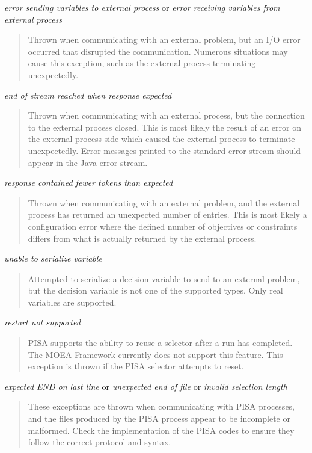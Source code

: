 \noindent
\textit{error sending variables to external process} or
\textit{error receiving variables from external process}
\begin{quote}
  Thrown when communicating with an external problem, but an I/O error occurred that disrupted the communication.  Numerous situations may cause this exception, such as the external process terminating unexpectedly.
\end{quote}

\noindent
\textit{end of stream reached when response expected}
\begin{quote}
  Thrown when communicating with an external process, but the connection to the external process closed.  This is most likely the result of an error on the external process side which caused the external process to terminate unexpectedly.  Error messages printed to the standard error stream should appear in the Java error stream.
\end{quote}

\noindent
\textit{response contained fewer tokens than expected}
\begin{quote}
  Thrown when communicating with an external problem, and the external process has returned an unexpected number of entries.  This is most likely a configuration error where the defined number of objectives or constraints differs from what is actually returned by the external process.
\end{quote}

\noindent
\textit{unable to serialize variable}
\begin{quote}
  Attempted to serialize a decision variable to send to an external problem, but the decision variable is not one of the supported types.  Only real variables are supported.
\end{quote}

\noindent
\textit{restart not supported}
\begin{quote}
  PISA supports the ability to reuse a selector after a run has completed. The MOEA Framework currently does not support this feature.  This exception is thrown if the PISA selector attempts to reset.
\end{quote}

\noindent
\textit{expected END on last line} or
\textit{unexpected end of file} or
\textit{invalid selection length}
\begin{quote}
  These exceptions are thrown when communicating with PISA processes, and the files produced by the PISA process appear to be incomplete or malformed. Check the implementation of the PISA codes to ensure they follow the correct protocol and syntax.
\end{quote}

